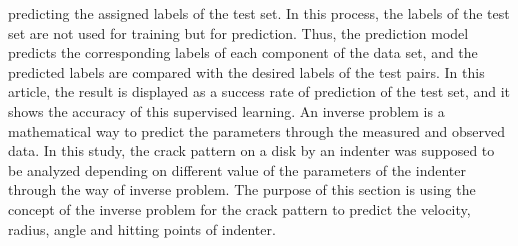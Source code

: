 predicting the assigned labels of the test set. In this process, the labels of the test set are not used for training but for prediction. Thus, the prediction model predicts the corresponding labels of each component of the data set, and the predicted labels are compared with the desired labels of the test pairs. In this article, the result is displayed as a success rate of prediction of the test set, and it shows the accuracy of this supervised learning. An inverse problem is a mathematical way to predict the parameters through the measured and observed data. In this study, the crack pattern on a disk by an indenter was supposed to be analyzed depending on different value of the parameters of the indenter through the way of inverse problem. The purpose of this section is using the concept of the inverse problem for the crack pattern to predict the velocity, radius, angle and hitting points of indenter.

